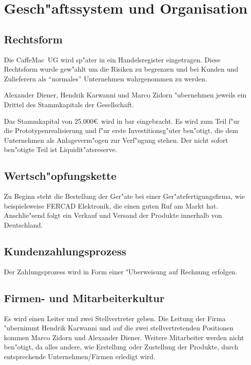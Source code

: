 \section{Gesch"aftssystem und Organisation}
\def \name {CaffeMac}
\def \startkapital {25.000\euro}

\subsection{Rechtsform}
Die \name\ UG wird sp"ater in ein Handelsregister eingetragen. Diese Rechtsform wurde gew"ahlt um die Risiken
zu begrenzen und bei Kunden und Zulieferern als "`normales"' Unternehmen wahrgenommen zu werden.

Alexander Diener, Hendrik Karwanni und Marco Zidorn "ubernehmen jeweils ein Drittel des Stammkapitals der Gesellschaft.

Das Stammkapital von \startkapital\ wird in bar eingebracht. Es wird zum Teil
f"ur die Prototypenrealisierung und f"ur erste Investitionsg"uter ben"otigt, die dem Unternehmen als Anlageverm"ogen zur Verf"ugung stehen. Der nicht sofort ben"otigte Teil ist Liquidit"atsreserve.

\subsection{Wertsch"opfungskette}
Zu Beginn steht die Bestellung der Ger"ate bei einer Ger"atefertigungsfirma, wie
 beispielsweise FERCAD Elektronik, die einen guten Ruf am Markt hat.
 Anschlie"send folgt ein Verkauf und Versand der Produkte innerhalb
 von Deutschland.

\subsection{Kundenzahlungsprozess}
Der Zahlungsprozess wird in Form einer "Uberweisung auf Rechnung erfolgen.

\subsection{Firmen- und Mitarbeiterkultur}
Es wird einen Leiter und zwei Stellvertreter geben.
Die Leitung der Firma "ubernimmt Hendrik Karwanni und auf die zwei
stellvertretenden Positionen kommen Marco Zidorn und Alexander Diener.
Weitere Mitarbeiter werden nicht ben"otigt, da alles andere, wie Erstellung oder
Zustellung der Produkte, durch entsprechende Unternehmen/Firmen erledigt wird.
